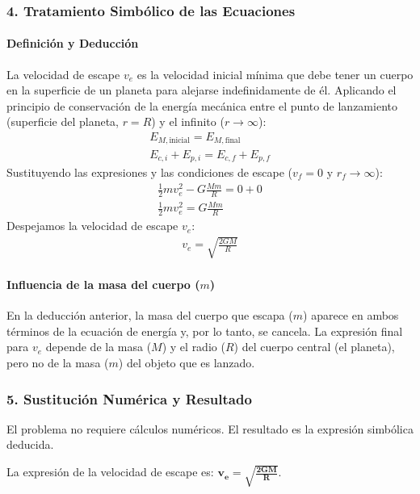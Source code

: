 \subsubsection*{4. Tratamiento Simbólico de las Ecuaciones}
\paragraph*{Definición y Deducción}
La velocidad de escape $v_e$ es la velocidad inicial mínima que debe tener un cuerpo en la superficie de un planeta para alejarse indefinidamente de él.
Aplicando el principio de conservación de la energía mecánica entre el punto de lanzamiento (superficie del planeta, $r=R$) y el infinito ($r \to \infty$):
\begin{gather}
    E_{M, \text{inicial}} = E_{M, \text{final}} \\
    E_{c,i} + E_{p,i} = E_{c,f} + E_{p,f} \nonumber
\end{gather}
Sustituyendo las expresiones y las condiciones de escape ($v_f=0$ y $r_f \to \infty$):
\begin{gather}
    \frac{1}{2} m v_e^2 - G \frac{M m}{R} = 0 + 0 \\
    \frac{1}{2} m v_e^2 = G \frac{M m}{R} \nonumber
\end{gather}
Despejamos la velocidad de escape $v_e$:
\begin{gather}
    v_e = \sqrt{\frac{2 G M}{R}}
\end{gather}

\paragraph*{Influencia de la masa del cuerpo ($m$)}
En la deducción anterior, la masa del cuerpo que escapa ($m$) aparece en ambos términos de la ecuación de energía y, por lo tanto, se cancela. La expresión final para $v_e$ depende de la masa ($M$) y el radio ($R$) del cuerpo central (el planeta), pero no de la masa ($m$) del objeto que es lanzado.

\subsubsection*{5. Sustitución Numérica y Resultado}
El problema no requiere cálculos numéricos. El resultado es la expresión simbólica deducida.
\begin{cajaresultado}
    La expresión de la velocidad de escape es: $\boldsymbol{v_e = \sqrt{\frac{2 G M}{R}}}$.
\end{cajaresultado}

